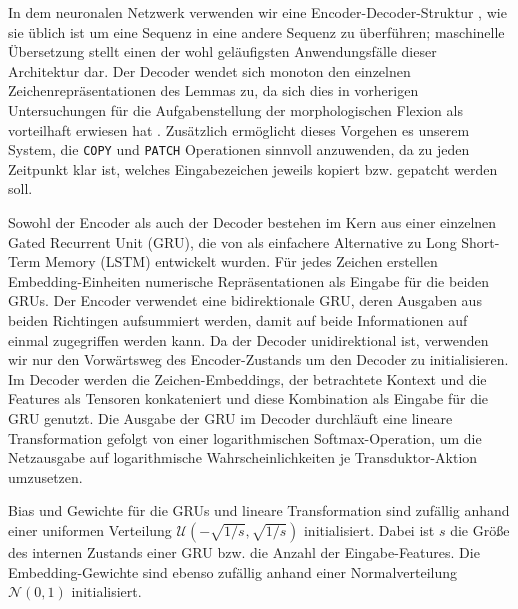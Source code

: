 \documentclass[11pt,a4paper]{article}
\newcommand{\action}[1]{\texttt{#1}}
\begin{document}
In dem neuronalen Netzwerk verwenden wir eine Encoder-Decoder-Struktur \citep{encdec:ChoMGBSB14, seq2seq:SutskeverVL14}, wie sie üblich ist um eine Sequenz in eine andere Sequenz zu überführen; maschinelle Übersetzung stellt einen der wohl geläufigsten Anwendungsfälle dieser Architektur dar.
Der Decoder wendet sich monoton den einzelnen Zeichenrepräsentationen des Lemmas zu, da sich dies in vorherigen Untersuchungen für die Aufgabenstellung der morphologischen Flexion als vorteilhaft erwiesen hat \citep{hardattention:AharoniG16,hardattention:AharoniEtAl}.
Zusätzlich ermöglicht dieses Vorgehen es unserem System, die \action{COPY} und \action{PATCH} Operationen sinnvoll anzuwenden, da zu jeden Zeitpunkt klar ist, welches Eingabezeichen jeweils kopiert bzw. gepatcht werden soll.

Sowohl der Encoder als auch der Decoder bestehen im Kern aus einer einzelnen Gated Recurrent Unit (GRU), die von \citet{encdec:ChoMGBSB14} als einfachere Alternative zu Long Short-Term Memory (LSTM) entwickelt wurden.
Für jedes Zeichen erstellen Embedding-Einheiten numerische Repräsentationen als Eingabe für die beiden GRUs.
Der Encoder verwendet eine bidirektionale GRU, deren Ausgaben aus beiden Richtingen aufsummiert werden, damit auf beide Informationen auf einmal zugegriffen werden kann.
Da der Decoder unidirektional ist, verwenden wir nur den Vorwärtsweg des Encoder-Zustands um den Decoder zu initialisieren.
Im Decoder werden die Zeichen-Embeddings, der betrachtete Kontext und die Features als Tensoren konkateniert und diese Kombination als Eingabe für die GRU genutzt.
Die Ausgabe der GRU im Decoder durchläuft eine lineare Transformation gefolgt von einer logarithmischen Softmax-Operation, um die Netzausgabe auf logarithmische Wahrscheinlichkeiten je Transduktor-Aktion umzusetzen. 

Bias und Gewichte für die GRUs und lineare Transformation sind zufällig anhand einer uniformen Verteilung $\mathcal{U}(-\sqrt{1/s}, \sqrt{1/s})$ initialisiert. Dabei ist $s$ die Größe des internen Zustands einer GRU bzw. die Anzahl der Eingabe-Features. Die Embedding-Gewichte sind ebenso zufällig anhand einer Normalverteilung $\mathcal{N}(0, 1)$ initialisiert.
\end{document}
